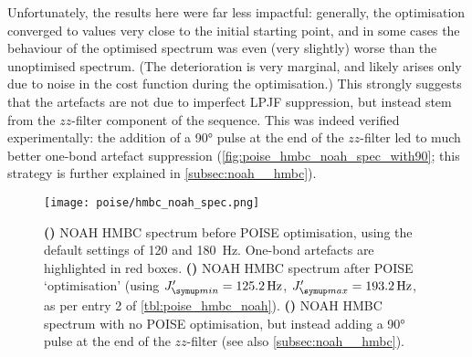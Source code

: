 Unfortunately, the results here were far less impactful: generally, the optimisation converged to values very close to the initial starting point, and in some cases the behaviour of the optimised spectrum was even (very slightly) worse than the unoptimised spectrum.
(The deterioration is very marginal, and likely arises only due to noise in the cost function during the optimisation.)
This strongly suggests that the artefacts are not due to imperfect LPJF suppression, but instead stem from the $zz$-filter component of the sequence.
This was indeed verified experimentally: the addition of a \carbon{} \ang{90} pulse at the end of the $zz$-filter led to much better one-bond artefact suppression (\cref{fig:poise_hmbc_noah_spec_with90}; this strategy is further explained in \cref{subsec:noah__hmbc}).

\begin{figure}[htb]
    \centering
    \texttt{[image: poise/hmbc\_noah\_spec.png]}%
    {\label{fig:poise_hmbc_noah_spec_unopt}}%
    {\label{fig:poise_hmbc_noah_spec_opt}}%
    {\label{fig:poise_hmbc_noah_spec_with90}}%
    \caption[NOAH HMBC spectra before and after optimisation]{
        \textbf{()} NOAH HMBC spectrum before POISE optimisation, using the default settings of 120 and \qty{180}{\Hz}.
        One-bond artefacts are highlighted in red boxes.
        \textbf{()} NOAH HMBC spectrum after POISE `optimisation' (using $\Jmin' = \qty{125.2}{\Hz}$, $\Jmax' = \qty{193.2}{\Hz}$, as per entry 2 of \cref{tbl:poise_hmbc_noah}).
        \textbf{()} NOAH HMBC spectrum with no POISE optimisation, but instead adding a \ang{90} \carbon{} pulse at the end of the $zz$-filter (see also \cref{subsec:noah__hmbc}).
    }
    \label{fig:poise_hmbc_noah_spec}
\end{figure}

